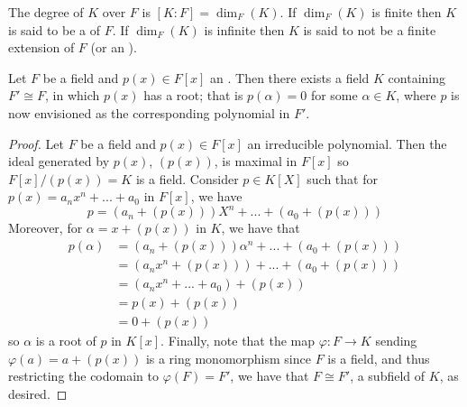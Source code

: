 \documentclass[12pt, a4paper, oneside, openright, titlepage]{book}
\begin{document}
\begin{defn}
    The degree of $K$ over $F$ is $[K:F] = \dim_F(K)$. If $\dim_F(K)$ is finite then $K$ is said to be a  of $F$. If $\dim_F(K)$ is infinite then $K$ is said to not be a finite extension of $F$ (or an ).
\end{defn}


\begin{thm}\label{thm:existext}
    Let $F$ be a field and $p(x) \in F[x]$ an . Then there exists a field $K$ containing $F' \cong F$, in which $p(x)$ has a root; that is $p(\alpha) = 0$ for some $\alpha \in K$, where $p$ is now envisioned as the corresponding polynomial in $F'$.
\end{thm}
\begin{proof}
    Let $F$ be a field and $p(x) \in F[x]$ an irreducible polynomial. Then the ideal generated by $p(x)$, $(p(x))$, is maximal in $F[x]$ so $F[x]/(p(x)) = K$ is a field. Consider $p \in K[X]$ such that for $p(x) = a_nx^n+...+a_0$ in $F[x]$, we have $$p = (a_n+(p(x)))X^n+...+(a_0+(p(x)))$$  Moreover, for $\alpha = x + (p(x))$ in $K$, we have that \begin{align*}
        p(\alpha) &= (a_n+(p(x)))\alpha^n+...+(a_0+(p(x))) \\
        &= (a_nx^n+(p(x))) + ... + (a_0+(p(x))) \\
        &= (a_nx^n+...+a_0) + (p(x)) \\
        &= p(x) + (p(x)) \\
        &= 0 + (p(x))
    \end{align*}
    so $\alpha$ is a root of $p$ in $K[x]$. Finally, note that the map $\varphi:F\rightarrow K$ sending $\varphi(a) = a+(p(x))$ is a ring monomorphism since $F$ is a field, and thus restricting the codomain to $\varphi(F) = F'$, we have that $F \cong F'$, a subfield of $K$, as desired.
\end{proof}
\end{document}
